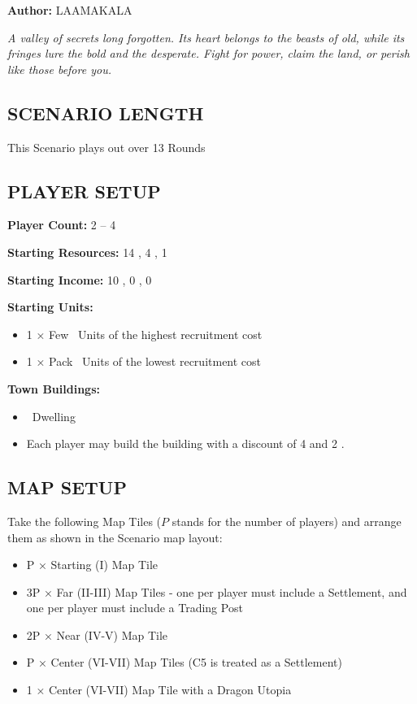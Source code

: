 
\begin{multicols*}{2}

\textbf{Author:} LAAMAKALA

\textit{A valley of secrets long forgotten. Its heart belongs to the beasts of old, while its fringes lure the bold and the desperate. Fight for power, claim the land, or perish like those before you.}

\subsection*{\MakeUppercase{Scenario Length}}
This Scenario plays out over 13 Rounds

\subsection*{\MakeUppercase{Player Setup}}
\textbf{Player Count:} 2 -- 4

\textbf{Starting Resources:} 14 , 4 , 1 

\textbf{Starting Income:} 10 , 0 , 0 

\textbf{Starting Units:}

\begin{itemize}
  \item 1 × Few \bronze\ Units of the highest recruitment cost
  \item 1 × Pack \bronze\ Units of the lowest recruitment cost
\end{itemize}

\textbf{Town Buildings:}
\begin{itemize}
  \item \bronze\ Dwelling
  \item Each player may build the  building with a discount of 4  and 2 .
\end{itemize}

\subsection*{\MakeUppercase{Map Setup}}
Take the following Map Tiles ($P$ stands for the number of players) and arrange them as shown in the Scenario map layout:

\begin{itemize}
  \item P × Starting (I) Map Tile
  \item 3P × Far (II-III) Map Tiles - one per player must include a Settlement, and one per player must include a Trading Post
  \item 2P × Near (IV-V) Map Tile
  \item P × Center (VI-VII) Map Tiles (C5 is treated as a Settlement)
  \item 1 × Center (VI-VII) Map Tile with a Dragon Utopia
\end{itemize}


\end{multicols*}
